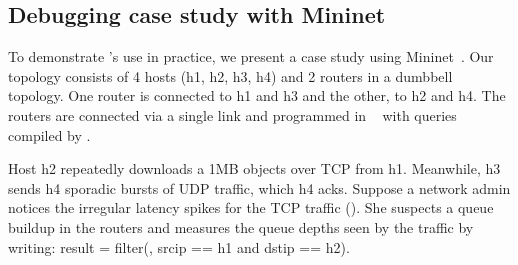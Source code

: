 
\subsection{Debugging case study with Mininet}
\label{s:eval:mininet}
\label{sec:eval:mininet}


To demonstrate \TheSystem's use in practice, we present a case study using
Mininet~\cite{mininet}.
Our topology consists of 4 hosts ({\ct h1, h2, h3, h4}) and 2 routers in a dumbbell topology.
One router is connected to {\ct h1} and {\ct h3}
and the other, to {\ct h2} and {\ct h4}.
The routers are connected via a single link and
programmed in \pfs~\cite{p4-bmv2} with queries compiled by \TheSystem.

Host {\ct h2} repeatedly downloads a 1MB objects over TCP from {\ct h1}.
Meanwhile, {\ct h3} sends {\ct h4} sporadic bursts of UDP traffic, which
{\ct h4} acks.  Suppose a network admin notices the irregular latency
spikes for the TCP traffic (). She suspects a queue buildup
in the routers and measures the queue depths seen by the traffic by writing:
{\ct result = filter(\pktlog, srcip == h1 and dstip == h2).}


